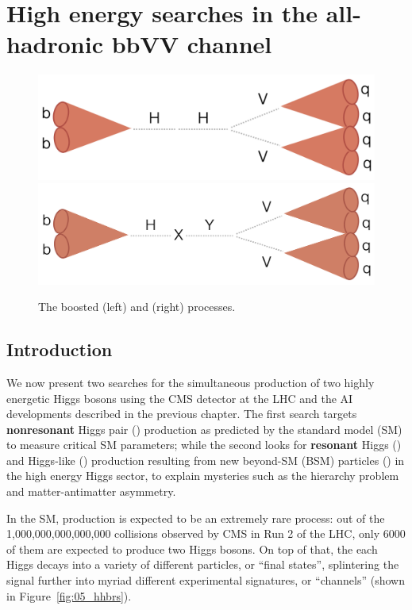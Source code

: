 \chapter{High energy \HH searches in the all-hadronic bbVV channel}
\label{sec:05_hh}

\begin{figure}[h!]
\centering
\includegraphics[height=0.106\textheight]{figures/05-HH/HHbbVV-cartoon.png}
\hspace{5pt}
\includegraphics[height=0.106\textheight]{figures/05-HH/XHYbbVV-cartoon.png}
\caption{The boosted \HHbbVVq (left) and \XHYbbVVq (right) processes.}
\label{fig:05_hhbbvv}
\end{figure}


\section{Introduction}

We now present two searches for the simultaneous production of two highly energetic Higgs bosons using the CMS detector at the LHC and the AI developments described in the previous chapter.
The first search targets \textbf{nonresonant} Higgs pair (\HH) production as predicted by the standard model (SM) to measure critical SM parameters; while the second looks for \textbf{resonant} Higgs (\PH) and Higgs-like (\PY) production resulting from new beyond-SM (BSM) particles (\PX) in the high energy Higgs sector, to explain mysteries such as the hierarchy problem and matter-antimatter asymmetry.

In the SM, \HH production is expected to be an extremely rare process: out of the 1,000,000,000,000,000 collisions observed by CMS in Run 2 of the LHC, only 6000 of them are expected to produce two Higgs bosons.
On top of that, the each Higgs decays into a variety of different particles, or ``final states'', splintering the signal further into myriad different experimental signatures, or ``channels'' (shown in Figure~\ref{fig:05_hhbrs}).

